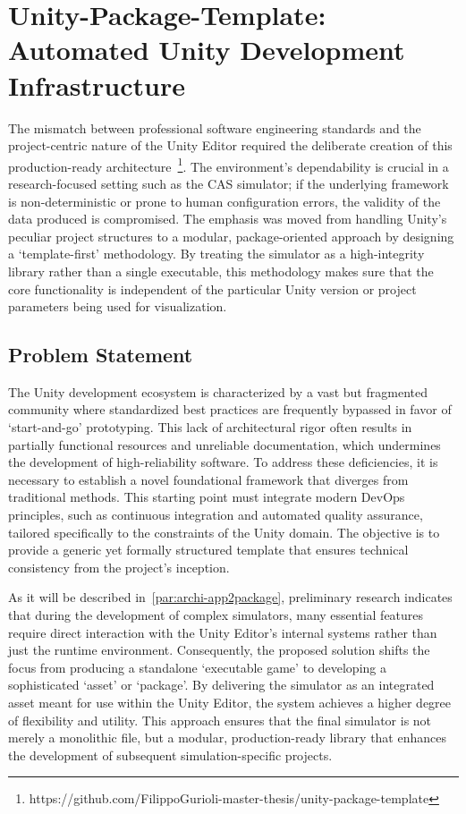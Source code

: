 \chapter{Unity-Package-Template: Automated Unity Development Infrastructure} \label{chap:unity_package_template}

The mismatch between professional software engineering standards and the project-centric nature of the Unity Editor required the deliberate creation of this production-ready architecture~\footnote{https://github.com/FilippoGurioli-master-thesis/unity-package-template}. The environment's dependability is crucial in a research-focused setting such as the \ac{CAS} simulator; if the underlying framework is non-deterministic or prone to human configuration errors, the validity of the data produced is compromised. The emphasis was moved from handling Unity's peculiar project structures to a modular, package-oriented approach by designing a `template-first' methodology. By treating the simulator as a high-integrity library rather than a single executable, this methodology makes sure that the core functionality is independent of the particular Unity version or project parameters being used for visualization.

\section{Problem Statement}

The Unity development ecosystem is characterized by a vast but fragmented community where standardized best practices are frequently bypassed in favor of `start-and-go' prototyping. This lack of architectural rigor often results in partially functional resources and unreliable documentation, which undermines the development of high-reliability software. To address these deficiencies, it is necessary to establish a novel foundational framework that diverges from traditional methods. This starting point must integrate modern DevOps principles, such as continuous integration and automated quality assurance, tailored specifically to the constraints of the Unity domain. The objective is to provide a generic yet formally structured template that ensures technical consistency from the project's inception.

As it will be described in~\cref{par:archi-app2package}, preliminary research indicates that during the development of complex simulators, many essential features require direct interaction with the Unity Editor's internal systems rather than just the runtime environment. Consequently, the proposed solution shifts the focus from producing a standalone `executable game' to developing a sophisticated `asset' or `package'. By delivering the simulator as an integrated asset meant for use within the Unity Editor, the system achieves a higher degree of flexibility and utility. This approach ensures that the final simulator is not merely a monolithic file, but a modular, production-ready library that enhances the development of subsequent simulation-specific projects.

